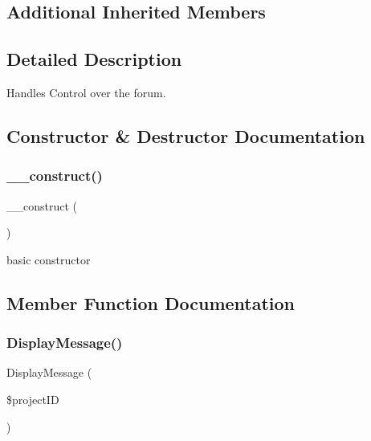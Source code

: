 \subsection*{Additional Inherited Members}


\subsection{Detailed Description}
Handles Control over the forum. 

\subsection{Constructor \& Destructor Documentation}
\mbox{\label{class_forum_controller_a095c5d389db211932136b53f25f39685}} 
\subsubsection{\texorpdfstring{\+\_\+\+\_\+construct()}{\_\_construct()}}
{\footnotesize\ttfamily \+\_\+\+\_\+construct (\begin{DoxyParamCaption}{ }\end{DoxyParamCaption})}



basic constructor 



\subsection{Member Function Documentation}
\mbox{\label{class_forum_controller_ae680809f7a8b645666ee0f185315e632}} 
\subsubsection{\texorpdfstring{Display\+Message()}{DisplayMessage()}}
{\footnotesize\ttfamily Display\+Message (\begin{DoxyParamCaption}\item[{}]{\$project\+ID }\end{DoxyParamCaption})}



